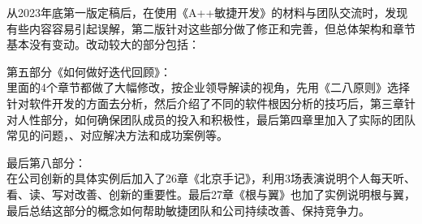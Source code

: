 从2023年底第一版定稿后，在使用《A++敏捷开发》的材料与团队交流时，发现有些内容容易引起误解，第二版针对这些部分做了修正和完善，但总体架构和章节基本没有变动。改动较大的部分包括：

第五部分《如何做好迭代回顾》：\\
里面的4个章节都做了大幅修改，按企业领导解读的视角，先用《二八原则》选择针对软件开发的方面去分析，然后介绍了不同的软件根因分析的技巧后，第三章针对人性部分，如何确保团队成员的投入和积极性，最后第四章里加入了实际的团队常见的问题，、对应解决方法和成功案例等。

最后第八部分：\\
在公司创新的具体实例后加入了26章《北京手记》，利用3场表演说明个人每天听、看、读、写对改善、创新的重要性。最后27章《根与翼》也加了实例说明根与翼，最后总结这部分的概念如何帮助敏捷团队和公司持续改善、保持竞争力。


